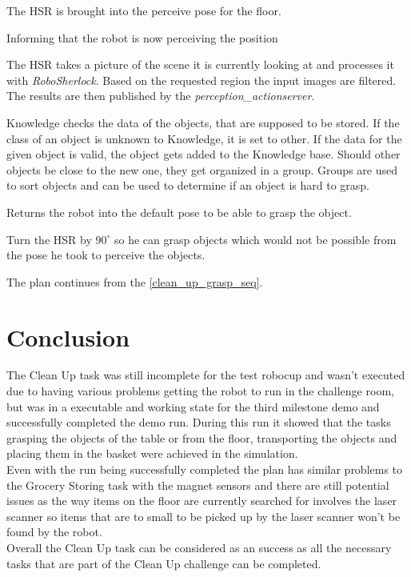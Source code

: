 \documentclass[main.tex]{subfiles}
\begin{document}
    The HSR is brought into the perceive pose for the floor.
    
    Informing that the robot is now perceiving the position
      
	The HSR takes a picture of the scene it is currently looking at and processes it with \textit{RoboSherlock}. Based on the requested region the input images are filtered. The results are then published by the \textit{perception\_actionserver}.

    
    Knowledge checks the data of the objects, that are supposed to be stored. If the class of an object is unknown to Knowledge, it is set to other. If the data for the given object is valid, the object gets added to the Knowledge base. Should other objects be close to the new one, they get organized in a group. Groups are used to sort objects and can be used to determine if an object is hard to grasp.
    
   	Returns the robot into the default pose to be able to grasp the object.

    Turn the HSR by $90^\circ$ so he can grasp objects which would not be possible from the pose he took to perceive the objects.

    The plan continues from the \ref{clean_up_grasp_seq}.
    
    
	\section{Conclusion}
	The Clean Up task was still incomplete for the test robocup and wasn't executed due to having various problems getting the robot to run in the challenge room, but was in a executable and working state for the third milestone demo and successfully completed the demo run. During this run it showed that the tasks grasping the objects of the table or from the floor, transporting the objects and placing them in the basket were achieved in the simulation.\\
	Even with the run being successfully completed the plan has similar problems to the Grocery Storing task with the magnet sensors and there are still potential issues as the way items on the floor are currently searched for involves the laser scanner so items that are to small to be picked up by the laser scanner won't be found by the robot.\\
	Overall the Clean Up task can be considered as an success as all the necessary tasks that are part of the Clean Up challenge can be completed. 
	
	\endgroup
\end{document}
